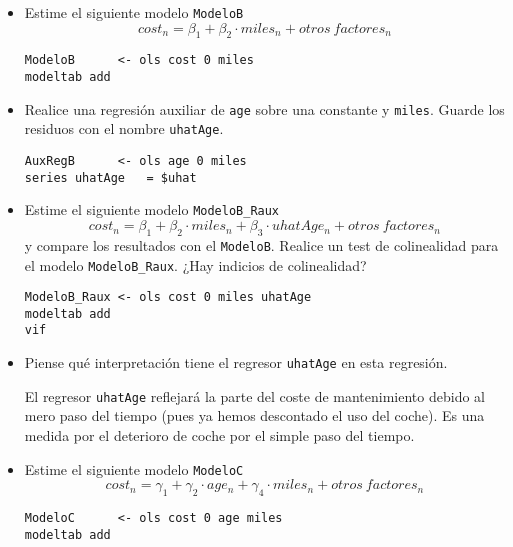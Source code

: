 \documentclass[11pt]{article}
\begin{document}
\begin{itemize}
\item Estime el siguiente modelo \texttt{ModeloB}
\begin{displaymath}
  cost_{n} = \beta_1 +  \beta_2 \cdot miles_n + otros\ factores_n
\end{displaymath}
{\vspace{0pt} \color{gray!70!black}
\begin{verbatim}
ModeloB      <- ols cost 0 miles
modeltab add
\end{verbatim}
}

\item Realice una regresión auxiliar de \texttt{age} sobre una constante y
\texttt{miles}. Guarde los residuos con el nombre \texttt{uhatAge}.
{\vspace{0pt} \color{gray!70!black}
\begin{verbatim}
AuxRegB      <- ols age 0 miles
series uhatAge   = $uhat
\end{verbatim}
}

\item Estime el siguiente modelo \texttt{ModeloB\_Raux}
\begin{displaymath}
  cost_{n} = \beta_1 +  \beta_2 \cdot miles_n + \beta_3 \cdot uhatAge_n + otros\ factores_n 
\end{displaymath}
y compare los resultados con el \texttt{ModeloB}. Realice un test de
colinealidad para el modelo \texttt{ModeloB\_Raux}. ¿Hay indicios de
colinealidad?
{\vspace{0pt} \color{gray!70!black}
\begin{verbatim}
ModeloB_Raux <- ols cost 0 miles uhatAge
modeltab add
vif
\end{verbatim}
}

\item Piense qué interpretación tiene el regresor \texttt{uhatAge} en esta
regresión.

{\color{gray!90!black} \small
El regresor \texttt{uhatAge} reflejará la parte del coste de
mantenimiento debido al mero paso del tiempo (pues ya hemos
descontado el uso del coche). Es una medida por el deterioro de
coche por el simple paso del tiempo.
}

\item Estime el siguiente modelo \texttt{ModeloC} 
\begin{displaymath}
  cost_{n} = \gamma_1 + \gamma_2\cdot age_n + \gamma_4 \cdot miles_n + otros\ factores_n
\end{displaymath}
{\vspace{0pt} \color{gray!70!black}
\begin{verbatim}
ModeloC      <- ols cost 0 age miles
modeltab add
\end{verbatim}
}


\end{itemize}
\end{document}
